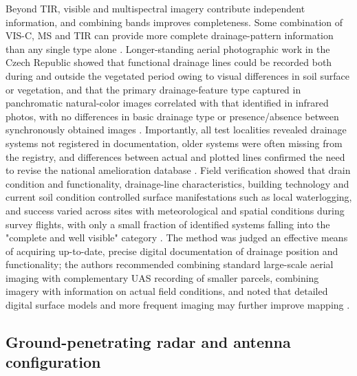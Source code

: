 Beyond TIR, visible and multispectral imagery contribute independent information, and combining bands improves completeness. Some combination of VIS-C, MS and TIR can provide more complete drainage-pattern information than any single type alone \parencite{Allred2020}. Longer-standing aerial photographic work in the Czech Republic showed that functional drainage lines could be recorded both during and outside the vegetated period owing to visual differences in soil surface or vegetation, and that the primary drainage-feature type captured in panchromatic natural-color images correlated with that identified in infrared photos, with no differences in basic drainage type or presence/absence between synchronously obtained images \parencite{Tlapáková2017}. Importantly, all test localities revealed drainage systems not registered in documentation, older systems were often missing from the registry, and differences between actual and plotted lines confirmed the need to revise the national amelioration database \parencite{Tlapáková2017}. Field verification showed that drain condition and functionality, drainage-line characteristics, building technology and current soil condition controlled surface manifestations such as local waterlogging, and success varied across sites with meteorological and spatial conditions during survey flights, with only a small fraction of identified systems falling into the "complete and well visible" category \parencite{Tlapáková2017}. The method was judged an effective means of acquiring up-to-date, precise digital documentation of drainage position and functionality; the authors recommended combining standard large-scale aerial imaging with complementary UAS recording of smaller parcels, combining imagery with information on actual field conditions, and noted that detailed digital surface models and more frequent imaging may further improve mapping \parencite{Tlapáková2017}.

\subsection{Ground-penetrating radar and antenna configuration}

